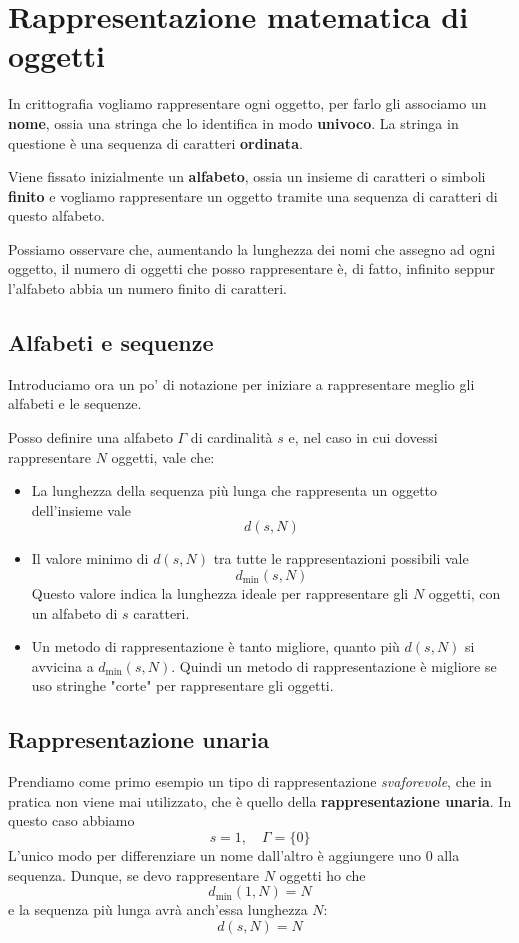 \chapter{Rappresentazione matematica di oggetti}
In crittografia vogliamo rappresentare ogni oggetto, per farlo gli associamo un \textbf{nome}, ossia una stringa che lo
identifica in modo \textbf{univoco}. La stringa in questione \`e una sequenza di caratteri \textbf{ordinata}.

Viene fissato inizialmente un \textbf{alfabeto}, ossia un insieme di caratteri o simboli \textbf{finito} e vogliamo
rappresentare un oggetto tramite una sequenza di caratteri di questo alfabeto.

Possiamo osservare che, aumentando la lunghezza dei nomi che assegno ad ogni oggetto, il numero di oggetti che posso
rappresentare \`e, di fatto, infinito seppur l'alfabeto abbia un numero finito di caratteri.

\section{Alfabeti e sequenze}
Introduciamo ora un po' di notazione per iniziare a rappresentare meglio gli alfabeti e le sequenze.

Posso definire una alfabeto $\Gamma$ di cardinalit\`a $s$ e, nel caso in cui dovessi rappresentare $N$ oggetti, vale che:
\begin{itemize}
	\item La lunghezza della sequenza pi\`u lunga che rappresenta un oggetto dell'insieme vale
	      \[ d(s, N) \]
	\item Il valore minimo di $d(s, N)$ tra tutte le rappresentazioni possibili vale
	      \[ d_{\min}(s, N) \]
	      Questo valore indica la lunghezza ideale per rappresentare gli $N$ oggetti, con un alfabeto di $s$ caratteri.
	\item Un metodo di rappresentazione \`e tanto migliore, quanto pi\`u $d(s, N)$ si avvicina a $d_{\min}(s, N)$. Quindi
	      un metodo di rappresentazione \`e migliore se uso stringhe "corte" per rappresentare gli oggetti.
\end{itemize}

\section{Rappresentazione unaria}
Prendiamo come primo esempio un tipo di rappresentazione \emph{svaforevole}, che in pratica non viene mai utilizzato, che
\`e quello della \textbf{rappresentazione unaria}. In questo caso abbiamo
\[ s = 1, \quad \Gamma = \{ 0 \} \]
L'unico modo per differenziare un nome dall'altro \`e aggiungere uno $0$ alla sequenza. Dunque, se devo rappresentare $N$
oggetti ho che
\[ d_{\min}(1, N) = N \]
e la sequenza pi\`u lunga avr\`a anch'essa lunghezza $N$:
\[ d(s, N) = N \]

